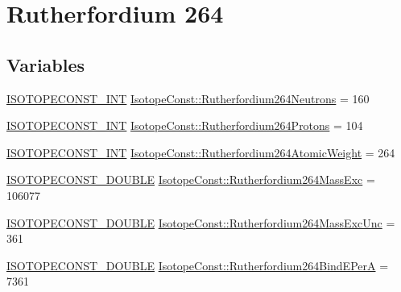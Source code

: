 \hypertarget{group___isotope_const-_rutherfordium-_rf264}{}\section{Rutherfordium 264}
\label{group___isotope_const-_rutherfordium-_rf264}
\subsection*{Variables}
\begin{DoxyCompactItemize}
\item 
\mbox{\hyperlink{group___isotope_const-_macros_ga5f18360b3e99483a35c32d789e62621c}{I\+S\+O\+T\+O\+P\+E\+C\+O\+N\+S\+T\+\_\+\+I\+NT}} \mbox{\hyperlink{group___isotope_const-_rutherfordium-_rf264_ga3d5b19ca2e647551c604246e7a18a97c}{Isotope\+Const\+::\+Rutherfordium264\+Neutrons}} = 160
\item 
\mbox{\hyperlink{group___isotope_const-_macros_ga5f18360b3e99483a35c32d789e62621c}{I\+S\+O\+T\+O\+P\+E\+C\+O\+N\+S\+T\+\_\+\+I\+NT}} \mbox{\hyperlink{group___isotope_const-_rutherfordium-_rf264_gada3a7b124c285e527fda6a76f1da63d6}{Isotope\+Const\+::\+Rutherfordium264\+Protons}} = 104
\item 
\mbox{\hyperlink{group___isotope_const-_macros_ga5f18360b3e99483a35c32d789e62621c}{I\+S\+O\+T\+O\+P\+E\+C\+O\+N\+S\+T\+\_\+\+I\+NT}} \mbox{\hyperlink{group___isotope_const-_rutherfordium-_rf264_ga888ae461a514eb49b41eec2f83bcde93}{Isotope\+Const\+::\+Rutherfordium264\+Atomic\+Weight}} = 264
\item 
\mbox{\hyperlink{group___isotope_const-_macros_ga8f45a7272ce02c0b4c65c44636ed719a}{I\+S\+O\+T\+O\+P\+E\+C\+O\+N\+S\+T\+\_\+\+D\+O\+U\+B\+LE}} \mbox{\hyperlink{group___isotope_const-_rutherfordium-_rf264_ga58817ec6354c80f1c715cc959ce8c06c}{Isotope\+Const\+::\+Rutherfordium264\+Mass\+Exc}} = 106077
\item 
\mbox{\hyperlink{group___isotope_const-_macros_ga8f45a7272ce02c0b4c65c44636ed719a}{I\+S\+O\+T\+O\+P\+E\+C\+O\+N\+S\+T\+\_\+\+D\+O\+U\+B\+LE}} \mbox{\hyperlink{group___isotope_const-_rutherfordium-_rf264_gad40d2988f7acd8ca52760d3e031ef90a}{Isotope\+Const\+::\+Rutherfordium264\+Mass\+Exc\+Unc}} = 361
\item 
\mbox{\hyperlink{group___isotope_const-_macros_ga8f45a7272ce02c0b4c65c44636ed719a}{I\+S\+O\+T\+O\+P\+E\+C\+O\+N\+S\+T\+\_\+\+D\+O\+U\+B\+LE}} \mbox{\hyperlink{group___isotope_const-_rutherfordium-_rf264_ga947fac34f75eb6d97ec6b36886ec6fcb}{Isotope\+Const\+::\+Rutherfordium264\+Bind\+E\+PerA}} = 7361

\end{DoxyCompactItemize}
